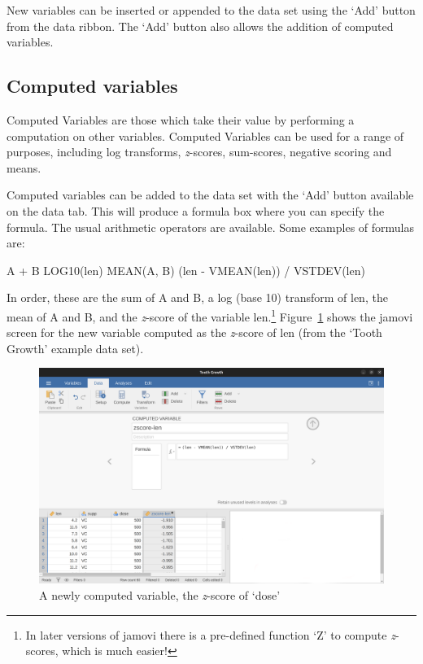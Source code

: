 \documentclass[
  a4paper,
]{book}
\begin{document}
New variables can be inserted or appended to the data set using the
`Add' button from the data ribbon. The `Add' button also allows the
addition of computed variables.

\hypertarget{computed-variables}{%
\subsection{Computed variables}\label{computed-variables}}

Computed Variables are those which take their value by performing a
computation on other variables. Computed Variables can be used for a
range of purposes, including log transforms, \emph{z}-scores,
sum-scores, negative scoring and means.

Computed variables can be added to the data set with the `Add' button
available on the data tab. This will produce a formula box where you can
specify the formula. The usual arithmetic operators are available. Some
examples of formulas are:

A + B LOG10(len) MEAN(A, B) (len - VMEAN(len)) / VSTDEV(len)

In order, these are the sum of A and B, a log (base 10) transform of
len, the mean of A and B, and the \emph{z}-score of the variable
len.\footnote{In later versions of jamovi there is a pre-defined
  function `Z' to compute \emph{z}-scores, which is much easier!}
Figure~\ref{fig-fig3-3} shows the jamovi screen for the new variable
computed as the \emph{z}-score of len (from the `Tooth Growth' example
data set).

\begin{figure}

\includegraphics[width=1\textwidth,height=\textheight]{images/fig3-3.png} \hfill{}

\caption{\label{fig-fig3-3}A newly computed variable, the \emph{z}-score
of `dose'}

\end{figure}
\end{document}
